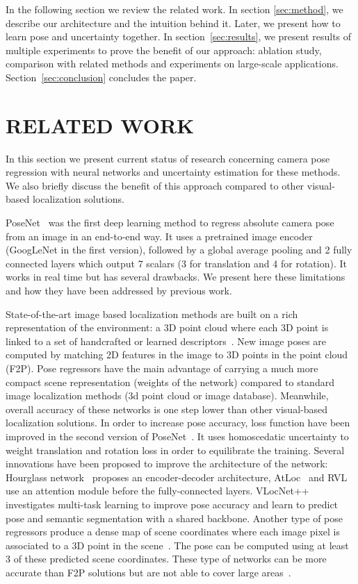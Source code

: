 \documentclass[10pt,twocolumn,letterpaper]{article}
\begin{document}
In the following section we review the related work. In section \ref{sec:method}, we describe our architecture and the intuition behind it. Later, we present how to learn pose and uncertainty together. In section~\ref{sec:results}, we present results of multiple experiments to prove the benefit of our approach: ablation study, comparison with related methods and experiments on large-scale applications. Section~\ref{sec:conclusion} concludes the paper. 
\section{RELATED WORK}
\label{sec:related_work}

In this section we present current status of research concerning camera pose regression with neural networks and uncertainty estimation for these methods. We also briefly discuss the benefit of this approach compared to other visual-based localization solutions.

PoseNet~\cite{PoseNet} was the first deep learning method to regress absolute camera pose from an image in an end-to-end way. It uses a pretrained image encoder (GoogLeNet in the first version), followed by a global average pooling and 2 fully connected layers which output 7 scalars (3 for translation and 4 for rotation). It works in real time but has several drawbacks. We present here these limitations and how they have been addressed by previous work.

State-of-the-art image based localization methods are built on a rich representation of the environment: a 3D point cloud where each 3D point is linked to a set of handcrafted or learned descriptors~\cite{sarlin2019coarse}. New image poses are computed by matching 2D features in the image to 3D points in the point cloud (F2P). Pose regressors have the main advantage of carrying a much more compact scene representation (weights of the network) compared to standard image localization methods (3d point cloud or image database). Meanwhile, overall accuracy of these networks is one step lower than other visual-based localization solutions. In order to increase pose accuracy, loss function have been improved in the second version of PoseNet~\cite{geometric_loss_function}. It uses homoscedatic uncertainty to weight translation and rotation loss in order to equilibrate the training. Several innovations have been proposed to improve the architecture of the network: Hourglass network~\cite{Hourglass} proposes an encoder-decoder architecture, AtLoc~\cite{AtLoc} and RVL~\cite{RVL} use an attention module before the fully-connected layers. VLocNet++~\cite{VLocNet++} investigates multi-task learning to improve pose accuracy and learn to predict pose and semantic segmentation with a shared backbone. Another type of pose regressors produce a dense map of scene coordinates where each image pixel is associated to a 3D point in the scene~\cite{Brachmann_2018_CVPR}. The pose can be computed using at least 3 of these predicted scene coordinates. These type of networks can be more accurate than F2P solutions but are not able to cover large areas~\cite{Brachmann_2019_ICCV}.
\end{document}
